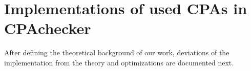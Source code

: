 \section{Implementations of used CPAs in CPAchecker}
After defining the theoretical background of our work, deviations of the implementation from the theory and optimizations are documented next.



